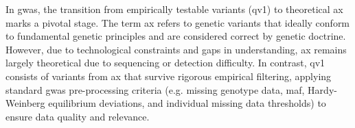 In \ac{gwas}, the transition from empirically testable variants (\ac{qv}1) to theoretical \ac{ax} marks a pivotal stage. The term \ac{ax} refers to genetic variants that ideally conform to fundamental genetic principles and are considered correct by genetic doctrine. However, due to technological constraints and gaps in understanding, \ac{ax} remains largely theoretical due to sequencing or detection difficulty. In contrast, \ac{qv}1 consists of variants from \ac{ax} that survive rigorous empirical filtering, applying standard \ac{gwas} pre-processing criteria (e.g. missing genotype data, \ac{maf}, Hardy-Weinberg equilibrium deviations, and individual missing data thresholds) to ensure data quality and relevance.


